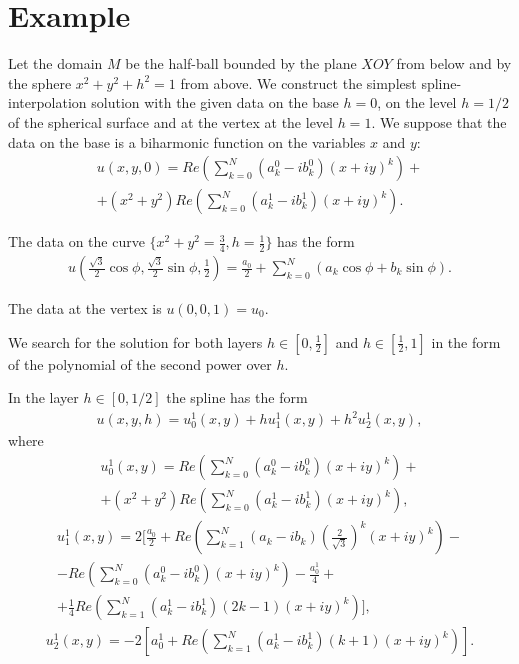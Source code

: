\documentclass{amsart}
\begin{document}
\section{Example}

Let the domain $M$ be the half-ball bounded by the plane $XOY$ from
below and by the sphere $x^2+y^2+h^2=1$ from above. We construct the
simplest spline-interpolation solution with the given data on the
base $h=0$, on the level $h=1/2$ of the spherical surface and at the
vertex at the level $h=1$. We suppose that the data on the base is a
biharmonic function on the variables $x$ and $y$:
\begin{eqnarray}
u(x,y,0) = Re (\sum_{k=0}^N (a_k^0-i b_k^0)(x+i y)^k)+\nonumber\\
+ (x^2+y^2) Re (\sum_{k=0}^N (a_k^1-i b_k^1)(x+i y)^k).\nonumber
\end{eqnarray}

The data on the curve $\{x^2+y^2=\frac{3}{4}, h=\frac{1}{2}\}$ has
the form
\begin{eqnarray}
u(\frac{\sqrt3}{2} \cos \phi, \frac{\sqrt3}{2} \sin
\phi,\frac{1}{2}) = \frac{a_0}{2} + \sum_{k=0}^N (a_k \cos \phi +
b_k \sin \phi).\nonumber
\end{eqnarray}

The data at the vertex is $u(0,0,1)=u_0$.

We search for the solution for both layers $h \in [0,\frac{1}{2}]$
and $h \in [\frac{1}{2},1]$ in the form of the polynomial of the
second power over $h$.

In the layer $h \in [0,1/2]$ the spline has the form
\begin{eqnarray}
u(x,y,h)=u_0^1(x,y)+h u_1^1(x,y)+h^2 u_2^1(x,y),\nonumber
\end{eqnarray}
where
\begin{eqnarray}
u_0^1(x,y)=Re (\sum_{k=0}^N (a_k^0-i b_k^0)(x+i y)^k)+\nonumber\\
+ (x^2+y^2) Re (\sum_{k=0}^N (a_k^1-i b_k^1)(x+i y)^k),\nonumber
\end{eqnarray}
\begin{eqnarray}
u_1^1(x,y)=2 [\frac{a_0}{2} + Re (\sum_{k=1}^N (a_k-i b_k)(\frac{2}{\sqrt3})^k (x+i y)^k)-\nonumber\\
-Re (\sum_{k=0}^N (a_k^0-i b_k^0)(x+i y)^k)-\frac{a_0^1}{4}+\nonumber\\
+\frac{1}{4} Re (\sum_{k=1}^N (a_k^1-i b_k^1) (2 k-1)(x+i
y)^k)],\nonumber
\end{eqnarray}
\begin{eqnarray}
u_2^1(x,y)=-2 [a_0^1+Re (\sum_{k=1}^N (a_k^1-i b_k^1) (k+1)(x+i
y)^k)].\nonumber
\end{eqnarray}
\end{document}
